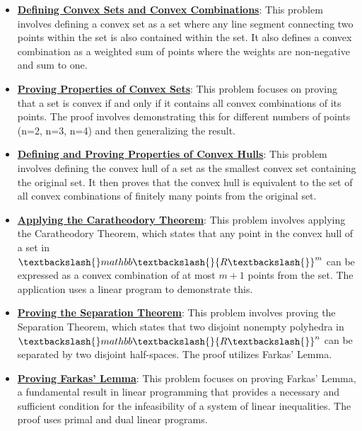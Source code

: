 \documentclass{article}%
\begin{document}
\begin{itemize}[leftmargin=*]%
\item \href{https://www.math.purdue.edu/~yipn/421/2024-10-22-Convexity.pdf#page=1}{\textbf{Defining Convex Sets and Convex Combinations}}: This problem involves defining a convex set as a set where any line segment connecting two points within the set is also contained within the set. It also defines a convex combination as a weighted sum of points where the weights are non-negative and sum to one.%
\item \href{https://www.math.purdue.edu/~yipn/421/2024-10-22-Convexity.pdf#page=2}{\textbf{Proving Properties of Convex Sets}}: This problem focuses on proving that a set is convex if and only if it contains all convex combinations of its points. The proof involves demonstrating this for different numbers of points (n=2, n=3, n=4) and then generalizing the result.%
\item \href{https://www.math.purdue.edu/~yipn/421/2024-10-22-Convexity.pdf#page=5}{\textbf{Defining and Proving Properties of Convex Hulls}}: This problem involves defining the convex hull of a set as the smallest convex set containing the original set. It then proves that the convex hull is equivalent to the set of all convex combinations of finitely many points from the original set.%
\item \href{https://www.math.purdue.edu/~yipn/421/2024-10-22-Convexity.pdf#page=9}{\textbf{Applying the Caratheodory Theorem}}: This problem involves applying the Caratheodory Theorem, which states that any point in the convex hull of a set in $\textbackslash{}mathbb\textbackslash{}{R\textbackslash{}}^m$ can be expressed as a convex combination of at most $m+1$ points from the set. The application uses a linear program to demonstrate this.%
\item \href{https://www.math.purdue.edu/~yipn/421/2024-10-22-Convexity.pdf#page=10}{\textbf{Proving the Separation Theorem}}: This problem involves proving the Separation Theorem, which states that two disjoint nonempty polyhedra in $\textbackslash{}mathbb\textbackslash{}{R\textbackslash{}}^n$ can be separated by two disjoint half-spaces. The proof utilizes Farkas' Lemma.%
\item \href{https://www.math.purdue.edu/~yipn/421/2024-10-22-Convexity.pdf#page=15}{\textbf{Proving Farkas' Lemma}}: This problem focuses on proving Farkas' Lemma, a fundamental result in linear programming that provides a necessary and sufficient condition for the infeasibility of a system of linear inequalities. The proof uses primal and dual linear programs.%
\end{itemize}%
\end{document}
